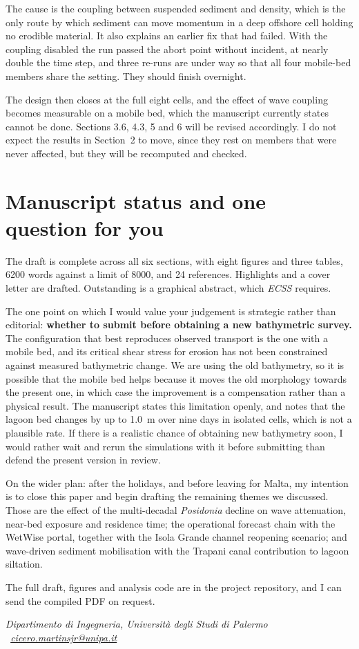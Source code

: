 \documentclass[11pt]{article}
\begin{document}
The cause is the coupling between suspended sediment and density, which is the
only route by which sediment can move momentum in a deep offshore cell holding
no erodible material. It also explains an earlier fix that had failed. With the
coupling disabled the run passed the abort point without incident, at nearly
double the time step, and three re-runs are under way so that all four
mobile-bed members share the setting. They should finish overnight.

The design then closes at the full eight cells, and the effect of wave coupling
becomes measurable on a mobile bed, which the manuscript currently states cannot
be done. Sections 3.6, 4.3, 5 and 6 will be revised accordingly. I do not expect
the results in Section~2 to move, since they rest on members that were never
affected, but they will be recomputed and checked.

\section{Manuscript status and one question for you}

The draft is complete across all six sections, with eight figures and three
tables, 6200 words against a limit of 8000, and 24 references. Highlights and a
cover letter are drafted. Outstanding is a graphical abstract, which
\textit{ECSS} requires.

The one point on which I would value your judgement is strategic rather than
editorial: \textbf{whether to submit before obtaining a new bathymetric survey.}
The configuration that best reproduces observed transport is the one with a
mobile bed, and its critical shear stress for erosion has not been constrained
against measured bathymetric change. We are using the old bathymetry, so it is
possible that the mobile bed helps because it moves the old morphology towards
the present one, in which case the improvement is a compensation rather than a
physical result. The manuscript states this limitation openly, and notes that
the lagoon bed changes by up to 1.0~m over nine days in isolated cells, which is
not a plausible rate. If there is a realistic chance of obtaining new bathymetry
soon, I would rather wait and rerun the simulations with it before submitting
than defend the present version in review.

On the wider plan: after the holidays, and before leaving for Malta, my
intention is to close this paper and begin drafting the remaining themes we
discussed. Those are the effect of the multi-decadal \emph{Posidonia} decline on
wave attenuation, near-bed exposure and residence time; the operational forecast
chain with the WetWise portal, together with the Isola Grande channel reopening
scenario; and wave-driven sediment mobilisation with the Trapani canal
contribution to lagoon siltation.

The full draft, figures and analysis code are in the project repository, and I
can send the compiled PDF on request.

\vspace{-0.2em}
{\footnotesize\itshape Dipartimento di Ingegneria, Universit\`a degli Studi di
Palermo \textperiodcentered\
\href{mailto:cicero.martinsjr@unipa.it}{cicero.martinsjr@unipa.it}}
\end{document}
